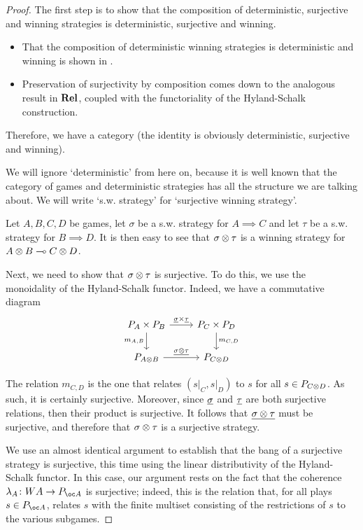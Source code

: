 \documentclass{article}
\begin{document}
\begin{proof}
  The first step is to show that the composition of deterministic, surjective and winning strategies is deterministic, surjective and winning.

  \begin{itemize}
    \item That the composition of deterministic winning strategies is deterministic and winning is shown in \cite{abramskyjagadeesangames}.
    \item Preservation of surjectivity by composition comes down to the analogous result in ${\normalfont\textbf{Rel}}$, coupled with the functoriality of the Hyland-Schalk construction.
  \end{itemize}

  Therefore, we have a category (the identity is obviously deterministic, surjective and winning).

  We will ignore `deterministic' from here on, because it is well known that the category of games and deterministic strategies has all the structure we are talking about.  We will write `s.w. strategy' for `surjective winning strategy'.

  Let $A,B,C,D$ be games, let $\sigma$ be a s.w. strategy for $A\implies C$ and let $\tau$ be a s.w. strategy for $B\implies D$.  
  It is then easy to see that $\sigma\otimes\tau$ is a winning strategy for $A\otimes B\multimap C\otimes D$.

  Next, we need to show that $\sigma\otimes\tau$ is surjective.  
  To do this, we use the monoidality of the Hyland-Schalk functor.  
  Indeed, we have a commutative diagram
  \[
    \begin{tikzcd}
      P_A \times P_B \arrow[r, "\grel{\sigma}\times\grel{\tau}"] \arrow[d, "m_{A,B}"']
        & P_C \times P_D \arrow[d, "m_{C,D}"] \\
      P_{A \tensor B} \arrow[r, "\grel{\sigma\tensor\tau}"]
        & P_{C \tensor D}
    \end{tikzcd}
    \]

  The relation $m_{C,D}$ is the one that relates $(s\vert_C,s\vert_D)$ to $s$ for all $s\in P_{C\otimes D}$.  
  As such, it is certainly surjective.  
  Moreover, since $\underline{\sigma}$ and $\underline{\tau}$ are both surjective relations, then their product is surjective.  
  It follows that $\underline{\sigma\otimes\tau}$ must be surjective, and therefore that $\sigma\otimes\tau$ is a surjective strategy.

  We use an almost identical argument to establish that the bang of a surjective strategy is surjective, this time using the linear distributivity of the Hyland-Schalk functor.  
  In this case, our argument rests on the fact that the coherence $\lambda_A \from W A \to P_{\oc A}$ is surjective; indeed, this is the relation that, for all plays $s\in P_{\oc A}$, relates $s$ with the finite multiset consisting of the restrictions of $s$ to the various subgames.


\end{proof}
\end{document}
